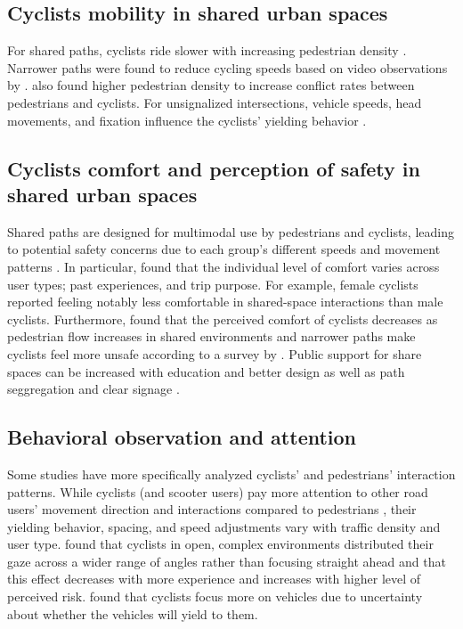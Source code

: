 \documentclass[3p,authoryear]{elsarticle}
\begin{document}
\subsection{Cyclists mobility in shared urban spaces}
For shared paths, cyclists ride slower with increasing pedestrian density
\citep{huang2021investigating,beitel2018assessing,boufous2018impact,essa2018road}.
Narrower paths were found to reduce cycling speeds based on video observations
by \citet{boufous2018impact}. \citet{beitel2018assessing} also found higher
pedestrian density to increase conflict rates between pedestrians and cyclists.
For unsignalized intersections, vehicle speeds, head movements, and fixation
influence the cyclists' yielding behavior
\citep{mohammadi2023how,mohammadi2024understanding}.

\subsection{Cyclists comfort and perception of safety in shared urban spaces}
Shared paths are designed for multimodal use by pedestrians and cyclists,
leading to potential safety concerns due to each group's different speeds and
movement patterns \citep{zhang2023space}. In particular,
\citet{kazemzadeh2024forwhom} found that the individual level of comfort varies
across user types; past experiences, and trip purpose. For example, female
cyclists reported feeling notably less comfortable in shared-space interactions
than male cyclists. Furthermore, \citet*{berghoefer2023prefer} found that the
perceived comfort of cyclists decreases as pedestrian flow increases in shared
environments and narrower paths make cyclists feel more unsafe according to a
survey by \citet{gkekas2020perceived}. Public support for share spaces can be
increased with education and better design \citet*{nikiforiadis2019can} as well
as path seggregation and clear signage \citet{batista2023exploring}.

\subsection{Behavioral observation and attention}
Some studies have more specifically analyzed cyclists' and pedestrians'
interaction patterns. While cyclists (and scooter users) pay more attention to
other road users' movement direction and interactions compared to pedestrians
\citet{pashkevich2022visual}, their yielding behavior, spacing, and speed
adjustments vary with traffic density and user type.
\citet{stulpnagel2020gaze} found that cyclists in open, complex environments
distributed their gaze across a wider range of angles rather than focusing
straight ahead and that this effect decreases with more experience and increases
with higher level of perceived risk. \citet{mohammadi2024understanding} found
that cyclists focus more on vehicles due to uncertainty about whether the
vehicles will yield to them.
\end{document}
